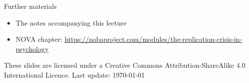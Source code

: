 \documentclass{beamer}
\begin{document}
\begin{frame}{Further materials}
  \begin{itemize}
  \item The notes accompanying this lecture
  \item NOVA chapter: \url{ https://nobaproject.com/modules/the-replication-crisis-in-psychology}
  \end{itemize}
  \vspace{12pt}    
      \tiny
These slides are licensed under a Creative Commons Attribution-ShareAlike
4.0 International Licence. Last update: \today
    
\end{frame}
\end{document}
